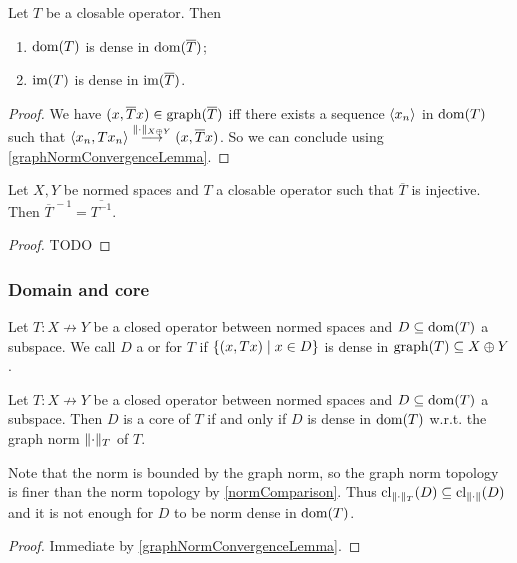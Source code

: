 \begin{lemma} \label{domImClosureOperator}
Let $T$ be a closable operator. Then
\begin{enumerate}
\item $\operatorname{dom}(T)$ is dense in $\operatorname{dom}(\overline{T})$;
\item $\operatorname{im}(T)$ is dense in $\operatorname{im}(\overline{T})$.
\end{enumerate}
\end{lemma}
\begin{proof}
We have $(x,\overline{T}x)\in\operatorname{graph}(\overline{T})$ iff there exists a sequence $\left\langle x_n \right\rangle$ in $\operatorname{dom}(T)$ such that $\left\langle x_n,Tx_n \right\rangle\overset{\lVert\cdot\rVert_{X\oplus Y}}{\longrightarrow} (x,\overline{T}x)$. So we can conclude using \ref{graphNormConvergenceLemma}.
\end{proof}

\begin{lemma}
Let $X,Y$ be normed spaces and $T$ a closable operator such that $\overline{T}$ is injective. Then $\overline{T}^{\,-1} = \overline{T^{-1}}$.
\end{lemma}
\begin{proof}
TODO
\end{proof}

\subsubsection{Domain and core}
\begin{definition}
Let $T: X\not\to Y$ be a closed operator between normed spaces and $D\subseteq \operatorname{dom}(T)$ a subspace. We call $D$ a  or  for $T$ if $\setbuilder{(x,Tx)}{x\in D}$ is dense in $\operatorname{graph}(T)\subseteq X\oplus Y$.
\end{definition}

\begin{proposition} \label{operatorCoreCriterion}
Let $T: X\not\to Y$ be a closed operator between normed spaces and $D\subseteq \operatorname{dom}(T)$ a subspace. Then $D$ is a core of $T$ \textup{if and only if} $D$ is dense in $\operatorname{dom}(T)$ w.r.t. the graph norm $\lVert\cdot\rVert_T$ of $T$.
\end{proposition}
Note that the norm is bounded by the graph norm, so the graph norm topology is finer than the norm topology by \ref{normComparison}. Thus $\operatorname{cl}_{\lVert\cdot\rVert_T}(D) \subseteq \operatorname{cl}_{\lVert\cdot\rVert}(D)$ and it is not enough for $D$ to be norm dense in $\operatorname{dom}(T)$.
\begin{proof}
Immediate by \ref{graphNormConvergenceLemma}.
\end{proof}






